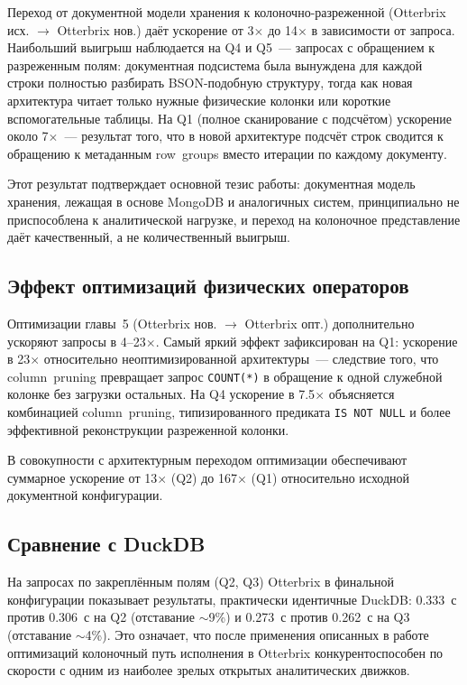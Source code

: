 Переход от документной модели хранения к колоночно-разреженной
(Otterbrix исх. $\to$ Otterbrix нов.) даёт ускорение от 3$\times$
до 14$\times$ в зависимости от запроса. Наибольший выигрыш
наблюдается на Q4 и Q5~--- запросах с обращением к разреженным
полям: документная подсистема была вынуждена для каждой строки
полностью разбирать BSON-подобную структуру, тогда как новая
архитектура читает только нужные физические колонки или короткие
вспомогательные таблицы. На Q1 (полное сканирование с подсчётом)
ускорение около 7$\times$~--- результат того, что в новой
архитектуре подсчёт строк сводится к обращению к метаданным
row~groups вместо итерации по каждому документу.

Этот результат подтверждает основной тезис работы: документная
модель хранения, лежащая в основе MongoDB и аналогичных систем,
принципиально не приспособлена к аналитической нагрузке, и
переход на колоночное представление даёт качественный, а не
количественный выигрыш.

\subsection{Эффект оптимизаций физических операторов}

Оптимизации главы~5 (Otterbrix нов. $\to$ Otterbrix опт.)
дополнительно ускоряют запросы в 4--23$\times$. Самый яркий эффект
зафиксирован на Q1: ускорение в 23$\times$ относительно неоптимизированной
архитектуры~--- следствие того, что column~pruning превращает
запрос \texttt{COUNT(*)} в обращение к одной служебной колонке без
загрузки остальных. На Q4 ускорение в 7.5$\times$ объясняется
комбинацией column~pruning, типизированного предиката
\texttt{IS~NOT~NULL} и более эффективной реконструкции разреженной
колонки.

В совокупности с архитектурным переходом оптимизации обеспечивают
суммарное ускорение от 13$\times$ (Q2) до 167$\times$ (Q1)
относительно исходной документной конфигурации.

\subsection{Сравнение с DuckDB}

На запросах по закреплённым полям (Q2, Q3) Otterbrix в финальной
конфигурации показывает результаты, практически идентичные DuckDB:
0.333~с против 0.306~с на Q2 (отставание $\sim$9\%) и 0.273~с
против 0.262~с на Q3 (отставание $\sim$4\%). Это означает, что
после применения описанных в работе оптимизаций колоночный путь
исполнения в Otterbrix конкурентоспособен по скорости с одним из
наиболее зрелых открытых аналитических движков.

